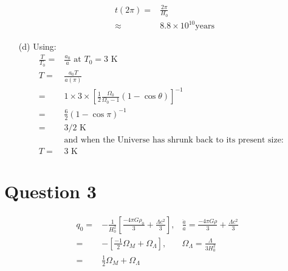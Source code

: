\documentclass[10pt,a4paper]{article}
\begin{document}
\begin{itemize}
\begin{align*}
	t(2\pi) =& \frac{2\pi}{H_{0}} \\
		  \approx& 8.8 \times 10^{10} \mbox{years}
	\end{align*}
	\item[(d)] Using:
	\begin{align*}
	\frac{T}{T_{0}} =& \frac{a_{0}}{a} \mbox{ at $T_{0} = 3$ K} &\\
	T =& \frac{a_{0}T}{a(\pi)} &\\
	  =& 1 \times 3 \times [\frac{1}{2}\frac{\Omega_{0}}{\Omega_{0} -1} (1 - \cos \theta)]^{-1} &\\
	  =& \frac{6}{2}(1 - \cos \pi)^{-1} &\\
	  =& 3/2 \mbox{ K}&\\
	  &\mbox{and when the Universe has shrunk back to its present size:} &\\
	  T =& 3 \mbox{ K}	
	\end{align*}
\end{itemize}

\section*{Question 3}
\begin{eqnarray*}
	q_{0} =& -\frac{1}{H_{0}^{2}}[\frac{-4\pi G \rho_{0}}{3} + \frac{\Lambda c^{2}}{3}], &\frac{\ddot a}{a} = \frac{-4\pi G \rho}{3} + \frac{\Lambda c^{2}}{3} \\
	=& -[\frac{-1}{2}\Omega_{M} + \Omega_{\Lambda}], &\Omega_{\Lambda} = \frac{\Lambda}{3H_{0}^{2}} \\
	=& \frac{1}{2}\Omega_{M} + \Omega_{\Lambda} &
\end{eqnarray*}
\end{document}

